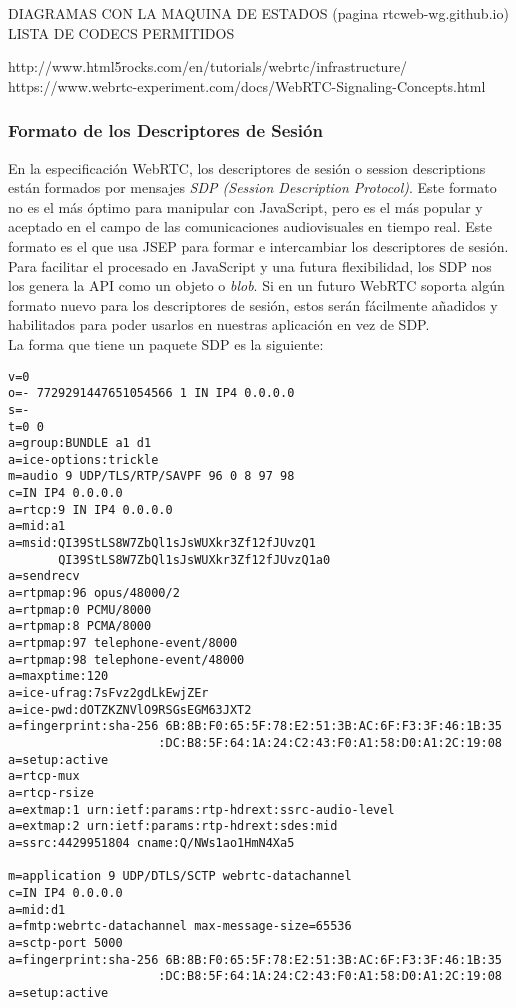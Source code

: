 DIAGRAMAS CON LA MAQUINA DE ESTADOS (pagina rtcweb-wg.github.io)
LISTA DE CODECS PERMITIDOS



http://www.html5rocks.com/en/tutorials/webrtc/infrastructure/
https://www.webrtc-experiment.com/docs/WebRTC-Signaling-Concepts.html

\subsubsection{Formato de los Descriptores de Sesión}

En la especificación WebRTC, los descriptores de sesión o session descriptions están formados por mensajes \textit{SDP (Session Description Protocol)}. Este formato no es el más óptimo para manipular con JavaScript, pero es el más popular y aceptado en el campo de las comunicaciones audiovisuales en tiempo real. Este formato es el que usa JSEP para formar e intercambiar los descriptores de sesión.\\

Para facilitar el procesado en JavaScript y una futura flexibilidad, los SDP nos los genera la API como un objeto o \textit{blob}. Si en un futuro WebRTC soporta algún formato nuevo para los descriptores de sesión, estos serán fácilmente añadidos y habilitados para poder usarlos en nuestras aplicación en vez de SDP.\\

La forma que tiene un paquete SDP es la siguiente:

\begin{lstlisting}[caption=Ejemplo paquete SDP]
v=0
o=- 7729291447651054566 1 IN IP4 0.0.0.0
s=-
t=0 0
a=group:BUNDLE a1 d1
a=ice-options:trickle
m=audio 9 UDP/TLS/RTP/SAVPF 96 0 8 97 98
c=IN IP4 0.0.0.0
a=rtcp:9 IN IP4 0.0.0.0
a=mid:a1
a=msid:QI39StLS8W7ZbQl1sJsWUXkr3Zf12fJUvzQ1
       QI39StLS8W7ZbQl1sJsWUXkr3Zf12fJUvzQ1a0
a=sendrecv
a=rtpmap:96 opus/48000/2
a=rtpmap:0 PCMU/8000
a=rtpmap:8 PCMA/8000
a=rtpmap:97 telephone-event/8000
a=rtpmap:98 telephone-event/48000
a=maxptime:120
a=ice-ufrag:7sFvz2gdLkEwjZEr
a=ice-pwd:dOTZKZNVlO9RSGsEGM63JXT2
a=fingerprint:sha-256 6B:8B:F0:65:5F:78:E2:51:3B:AC:6F:F3:3F:46:1B:35
                     :DC:B8:5F:64:1A:24:C2:43:F0:A1:58:D0:A1:2C:19:08
a=setup:active
a=rtcp-mux
a=rtcp-rsize
a=extmap:1 urn:ietf:params:rtp-hdrext:ssrc-audio-level
a=extmap:2 urn:ietf:params:rtp-hdrext:sdes:mid
a=ssrc:4429951804 cname:Q/NWs1ao1HmN4Xa5

m=application 9 UDP/DTLS/SCTP webrtc-datachannel
c=IN IP4 0.0.0.0
a=mid:d1
a=fmtp:webrtc-datachannel max-message-size=65536
a=sctp-port 5000
a=fingerprint:sha-256 6B:8B:F0:65:5F:78:E2:51:3B:AC:6F:F3:3F:46:1B:35
                     :DC:B8:5F:64:1A:24:C2:43:F0:A1:58:D0:A1:2C:19:08
a=setup:active
\end{lstlisting}


